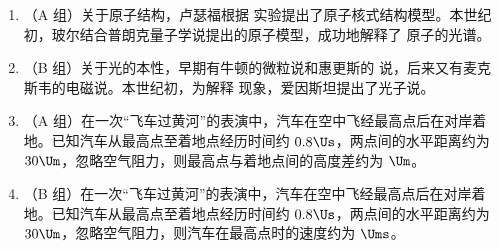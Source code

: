 \documentclass[\gkver]{gaokaozhenti}
\begin{document}
\begin{enumerate}

\item
（A 组）关于原子结构，卢瑟福根据  实验提出了原子核式结构模型。本世纪初，玻尔结合普朗克量子学说提出的原子模型，成功地解释了  原子的光谱。


\item
（B 组）关于光的本性，早期有牛顿的微粒说和惠更斯的  说，后来又有麦克斯韦的电磁说。本世纪初，为解释  现象，爱因斯坦提出了光子说。


\item
（A 组）在一次“飞车过黄河”的表演中，汽车在空中飞经最高点后在对岸着地。已知汽车从最高点至着地点经历时间约 $0.8\Us$，两点间的水平距离约为 $30\Um$，忽略空气阻力，则最高点与着地点间的高度差约为  $\Um$。


\item
（B 组）在一次“飞车过黄河”的表演中，汽车在空中飞经最高点后在对岸着地。已知汽车从最高点至着地点经历时间约 $0.8\Us$，两点间的水平距离约为 $30\Um$，忽略空气阻力，则汽车在最高点时的速度约为  $\Ums$。



\end{enumerate}
\end{document}
